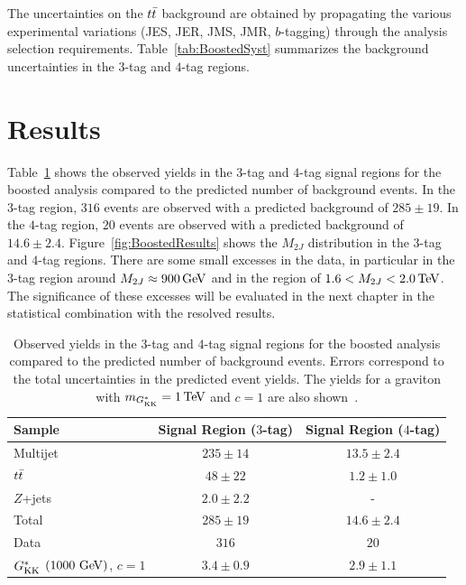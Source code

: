 The uncertainties on the $t\bar{t}$ background are obtained by propagating the various experimental variations (JES, JER, JMS, JMR, $b$-tagging) through the analysis selection requirements. Table~\ref{tab:BoostedSyst} summarizes the background uncertainties in the $3$-tag and $4$-tag regions. 

\section{Results}

Table~\ref{tab:BoostedResults} shows the observed yields in the $3$-tag and $4$-tag signal regions for the boosted analysis compared to the predicted number of background events. In the $3$-tag region, $316$ events are observed with a predicted background of $285\pm19$. In the $4$-tag region, $20$ events are observed with a predicted background of $14.6\pm 2.4$. Figure~\ref{fig:BoostedResults} shows the $M_{2J}$ distribution in the $3$-tag and $4$-tag regions. There are some small excesses in the data, in particular in the $3$-tag region around $M_{2J} \approx 900 \GeV$ and in the region of $1.6 < M_{2J} < 2.0 \TeV$. The significance of these excesses will be evaluated in the next chapter in the statistical combination with the resolved results. 

\begin{table}[!htb]
\captionsetup{justification=centering}
\begin{center}
\begin{tabular}{ l c c }
\toprule
 Sample  & Signal Region ($3$-tag)    & Signal Region ($4$-tag) \\ 
\midrule
Multijet &  $235  \pm 14$       & $13.5 \pm 2.4$ \\
$t\bar{t}$   &  $48   \pm 22$       & $1.2  \pm 1.0$ \\
$Z$+jets &  $2.0  \pm 2.2$      &       -        \\
\midrule
Total    &  $285  \pm 19$       & $14.6 \pm 2.4$ \\
 \midrule
Data   &  $316$                 & $20$ \\
\midrule
$G^*_{\rm KK}$ $\left(1000\,\GeV{}\right)$, $c = 1$ & $3.4 \pm 0.9$  & $2.9 \pm 1.1$ \\
\bottomrule
\end{tabular}
\caption{Observed yields in the $3$-tag and $4$-tag signal regions for the boosted analysis compared to the predicted number of background events.
  Errors correspond to the total uncertainties in the predicted event yields. The yields for a graviton with $m_{\Gkk} = 1\TeV$ and $c = 1$ are also shown~\cite{4bconf}.}
\label{tab:BoostedResults} 
\end{center}
\end{table}

